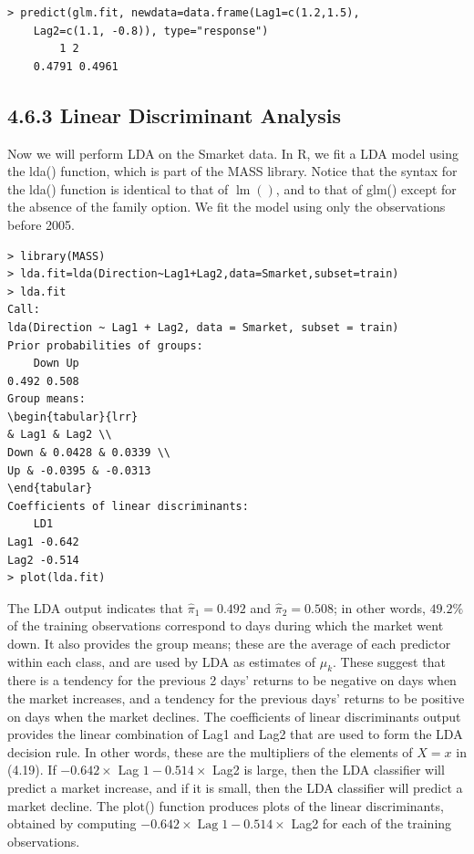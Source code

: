 \documentclass[10pt]{article}
\begin{document}
\begin{verbatim}
> predict(glm.fit, newdata=data.frame(Lag1=c(1.2,1.5),
    Lag2=c(1.1, -0.8)), type="response")
        1 2
    0.4791 0.4961
\end{verbatim}

\subsection*{4.6.3 Linear Discriminant Analysis}
Now we will perform LDA on the Smarket data. In R, we fit a LDA model using the lda() function, which is part of the MASS library. Notice that the syntax for the lda() function is identical to that of $\operatorname{lm}()$, and to that of glm() except for the absence of the family option. We fit the model using only the observations before 2005.

\begin{verbatim}
> library(MASS)
> lda.fit=lda(Direction~Lag1+Lag2,data=Smarket,subset=train)
> lda.fit
Call:
lda(Direction ~ Lag1 + Lag2, data = Smarket, subset = train)
Prior probabilities of groups:
    Down Up
0.492 0.508
Group means:
\begin{tabular}{lrr} 
& Lag1 & Lag2 \\
Down & 0.0428 & 0.0339 \\
Up & -0.0395 & -0.0313
\end{tabular}
Coefficients of linear discriminants:
    LD1
Lag1 -0.642
Lag2 -0.514
> plot(lda.fit)
\end{verbatim}

The LDA output indicates that $\hat{\pi}_{1}=0.492$ and $\hat{\pi}_{2}=0.508$; in other words, $49.2 \%$ of the training observations correspond to days during which the market went down. It also provides the group means; these are the average of each predictor within each class, and are used by LDA as estimates of $\mu_{k}$. These suggest that there is a tendency for the previous 2 days' returns to be negative on days when the market increases, and a tendency for the previous days' returns to be positive on days when the market declines. The coefficients of linear discriminants output provides the linear combination of Lag1 and Lag2 that are used to form the LDA decision rule. In other words, these are the multipliers of the elements of $X=x$ in (4.19). If $-0.642 \times$ Lag $1-0.514 \times$ Lag2 is large, then the LDA classifier will predict a market increase, and if it is small, then the LDA classifier will predict a market decline. The plot() function produces plots of the linear discriminants, obtained by computing $-0.642 \times \operatorname{Lag} 1-0.514 \times$ Lag2 for each of the training observations.
\end{document}
